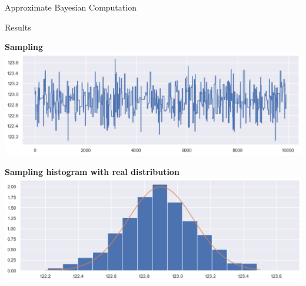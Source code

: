 \documentclass{beamer}
\begin{document}
\begin{section}{Approximate Bayesian Computation}
\begin{frame}{Results}
\begin{center}
\begin{minipage}{0.63\textwidth}
\begin{center}
	{\scriptsize \textbf{Sampling}}
	\includegraphics[width=\textwidth]{img/mcmc_abc_sampling}
\end{center}
\end{minipage}

\vspace{0.2cm}

\begin{minipage}{0.63\textwidth}
\begin{center}
	{\scriptsize \textbf{Sampling histogram with real distribution}}
	\includegraphics[width=\textwidth]{img/mcmc_abc_histogram}
\end{center}
\end{minipage}
\end{center}
\end{frame}
\end{section}
\end{document}
